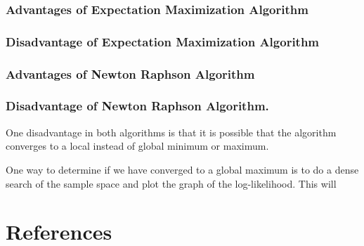 \documentclass[]{article}
\begin{document}
\subsubsection{Advantages of Expectation Maximization
Algorithm}\label{advantages-of-expectation-maximization-algorithm}

\subsubsection{Disadvantage of Expectation Maximization
Algorithm}\label{disadvantage-of-expectation-maximization-algorithm}

\subsubsection{Advantages of Newton Raphson
Algorithm}\label{advantages-of-newton-raphson-algorithm}

\subsubsection{Disadvantage of Newton Raphson
Algorithm.}\label{disadvantage-of-newton-raphson-algorithm.}

One disadvantage in both algorithms is that it is possible that the
algorithm converges to a local instead of global minimum or maximum.

One way to determine if we have converged to a global maximum is to do a
dense search of the sample space and plot the graph of the
log-likelihood. This will

\subsection{}\label{section}

\section{References}\label{references}
\end{document}
